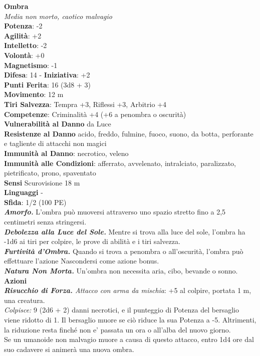 \begin{multicols}{2}
\medskip\textbf{Ombra}\\
\emph{Media non morto, caotico malvagio}\\
\textbf{Potenza}: -2\\
\textbf{Agilità}: +2\\
\textbf{Intelletto}: -2\\
\textbf{Volontà}: +0\\
\textbf{Magnetismo}: -1\\
\textbf{Difesa}: 14 - \textbf{Iniziativa}: +2\\
\textbf{Punti Ferita}: 16 (3d8 + 3)\\
\textbf{Movimento}: 12 m\\
\textbf{Tiri Salvezza}: Tempra +3, Riflessi +3, Arbitrio +4\\
\textbf{Competenze}: Criminalità +4 (+6 a penombra o oscurità)\\
\textbf{Vulnerabilità al Danno} da Luce\\
\textbf{Resistenze al Danno} acido, freddo, fulmine, fuoco, suono, da botta, perforante e tagliente di attacchi non magici\\
\textbf{Immunità al Danno}: necrotico, veleno\\
\textbf{Immunità alle Condizioni}: afferrato, avvelenato, intralciato, paralizzato, pietrificato, prono, spaventato\\
\textbf{Sensi} Scurovisione 18 m\\
\textbf{Linguaggi} -\\
\textbf{Sfida}: 1/2 (100 PE)\smallskip\\
\emph{\textbf{Amorfo.}} L'ombra può muoversi attraverso uno spazio stretto fino a 2,5 centimetri senza stringersi. \\
\emph{\textbf{Debolezza alla Luce del Sole.}} Mentre si trova alla luce del sole, l'ombra ha -1d6 ai tiri per colpire, le prove di abilità e i tiri salvezza.\\
\emph{\textbf{Furtività d'Ombra.}} Quando si trova a penombra o all'oscurità, l'ombra può effettuare l'azione Nascondersi come azione bonus.\\
\emph{\textbf{Natura Non Morta.}} Un'ombra non necessita aria, cibo, bevande o sonno.\\
\smallskip\textbf{Azioni}\\
\emph{\textbf{Risucchio di Forza.} Attacco con arma da mischia}: +5 al colpire, portata 1 m, una creatura.\\
\emph{Colpisce:} 9 (2d6 + 2) danni necrotici, e il punteggio di Potenza del bersaglio viene ridotto di 1.  Il bersaglio muore se ciò riduce la sua Potenza a -5. Altrimenti, la riduzione resta finché non e' passata un ora o all'alba del nuovo giorno.\\
Se un umanoide non malvagio muore a causa di questo attacco, entro 1d4 ore dal suo cadavere si animerà una nuova ombra.\\


\end{multicols}
